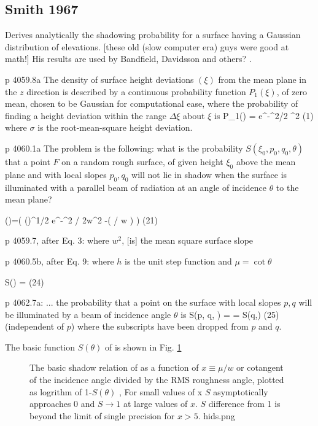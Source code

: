 \documentclass{article}
\newcommand{\erfc}{\mathrm{erfc}}  %
\begin{document}
\subsection{Smith  1967} %

Derives analytically the shadowing probability for a surface having a Gaussian
distribution of elevations. [these old (slow computer era) guys were good at
  math!] His results are used by Bandfield, Davidsson and others? .

p 4059.8a \bq The density of surface height deviations $(\xi)$ from the mean
plane in the $z$ direction is described by a continuous probability function
$P_1(\xi)$, of zero mean, chosen to be Gaussian for computational ease, where
the probability of finding a height deviation within the range $\Delta \xi$
about $\xi$ is 
\qb P_1(\xi) \Delta \xi = 
e^{-\xi^2/2 \sigma ^2} \cdot \Delta \xi \qeq (1) \qe 
where $\sigma$ is the root-mean-square height deviation. \eq

p 4060.1a \bq The problem is the following: what is the probability $ S( \xi_0,
p_0, q_0, \theta)$ that a point $F$ on a random rough surface, of given height
$\xi_0$ above the mean plane and with local slopes $p_0, q_0$ will not lie in
shadow when the surface is illuminated with a parallel beam of radiation at an
angle of incidence $\theta$ to the mean plane? \eq

 \Lambda(\mu)=\left( \left(\right)^{1/2} \cdot {}
e^{-\mu^2 / 2w^2} -\erfc \left(  \mu /  w \right) \right)  \qeq (21) \qe

p 4059.7, after Eq. 3:  \bq where $w^2$, [is] the mean square surface slope
\eq

p 4060.5b, after Eq. 9: \bq where $h$ is the unit step function and $\mu = \cot
\theta $ \ \eq
 
\qb S(\theta) = \frac{ \left[ 1- \frac{1}{2} \erfc \left( \mu / \sqrt{2} w
    \right) \right]} {\left[ \Lambda(\mu) +1 \right] } \qeq (24) \qe

p 4062.7a: \bq ... the probability that a point on the surface with local slopes
$p, q$ will be illuminated by a beam of incidence angle $\theta$ is
\qb S(p, q, \theta) =  =
S(q,\theta) \qeq (25) \qe (independent of $p$) where the subscripts have been
dropped from $p$ and $q$. \eq

The basic function $S(\theta)$ of  is shown in Fig.
\ref{hids}
\begin{figure}[!ht] 
\caption[Shadow function]{The basic shadow relation of  as a
  function of $x\equiv \mu/w$ or cotangent of the incidence angle divided by the
  RMS roughness angle, plotted as logrithm of 1-$S(\theta)$ , For small values
  of x $S$ asymptotically approaches 0 and $S \rightarrow 1$ at large values of
  $x$. $S$ difference from 1 is beyond the limit of single precision for $x >
  5$.
\label{hids}  hids.png  }
\end{figure} 
\end{document}
